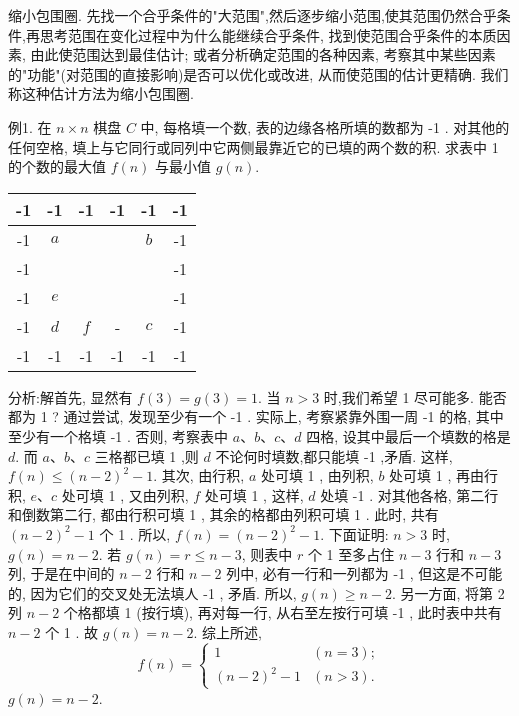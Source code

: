 
缩小包围圈.
先找一个合乎条件的"大范围",然后逐步缩小范围,使其范围仍然合乎条件,再思考范围在变化过程中为什么能继续合乎条件, 找到使范围合乎条件的本质因素, 由此使范围达到最佳估计; 或者分析确定范围的各种因素, 考察其中某些因素的"功能"(对范围的直接影响)是否可以优化或改进, 从而使范围的估计更精确.
我们称这种估计方法为缩小包围圈.



例1. 在 $n \times n$ 棋盘 $C$ 中, 每格填一个数, 表的边缘各格所填的数都为 -1 . 对其他的任何空格, 填上与它同行或同列中它两侧最靠近它的已填的两个数的积.
求表中 1 的个数的最大值 $f(n)$ 与最小值 $g(n)$. 
\begin{tabular}{|c|c|c|c|c|c|}
\hline-1 & -1 & -1 & -1 & -1 & -1 \\
\hline-1 & $a$ & & & $b$ & -1 \\
\hline-1 & & & & & -1 \\
\hline-1 & $e$ & & & & -1 \\
\hline-1 & $d$ & $f$ & - & $c$ & -1 \\
\hline-1 & -1 & -1 & -1 & -1 & -1 \\
\hline
\end{tabular}
分析:解首先, 显然有 $f(3)=g(3)=1$.
当 $n>3$ 时,我们希望 1 尽可能多.
能否都为 1 ? 通过尝试, 发现至少有一个 -1 . 实际上, 考察紧靠外围一周 -1 的格, 其中至少有一个格填 -1 . 否则, 考察表中 $a 、 b 、 c 、 d$ 四格, 设其中最后一个填数的格是 $d$. 而 $a 、 b 、 c$ 三格都已填 1 ,则 $d$ 不论何时填数,都只能填 -1 ,矛盾.
这样, $f(n) \leqslant(n-2)^2-1$.
其次, 由行积, $a$ 处可填 1 , 由列积, $b$ 处可填 1 , 再由行积, $e 、 c$ 处可填 1 , 又由列积, $f$ 处可填 1 , 这样, $d$ 处填 -1 . 对其他各格, 第二行和倒数第二行, 都由行积可填 1 , 其余的格都由列积可填 1 . 此时, 共有 $(n-2)^2-1$ 个 1 . 所以,
$f(n)=(n-2)^2-1$.
下面证明: $n>3$ 时, $g(n)=n-2$.
若 $g(n)=r \leqslant n-3$, 则表中 $r$ 个 1 至多占住 $n-3$ 行和 $n-3$ 列, 于是在中间的 $n-2$ 行和 $n-2$ 列中, 必有一行和一列都为 -1 , 但这是不可能的, 因为它们的交叉处无法填人 -1 , 矛盾.
所以, $g(n) \geqslant n-2$.
另一方面, 将第 2 列 $n-2$ 个格都填 1 (按行填), 再对每一行, 从右至左按行可填 -1 , 此时表中共有 $n-2$ 个 1 . 故 $g(n)=n-2$.
综上所述,
$$
f(n)= \begin{cases}1 & (n=3) ; \\ (n-2)^2-1 & (n>3) .\end{cases}
$$
$g(n)=n-2$.



